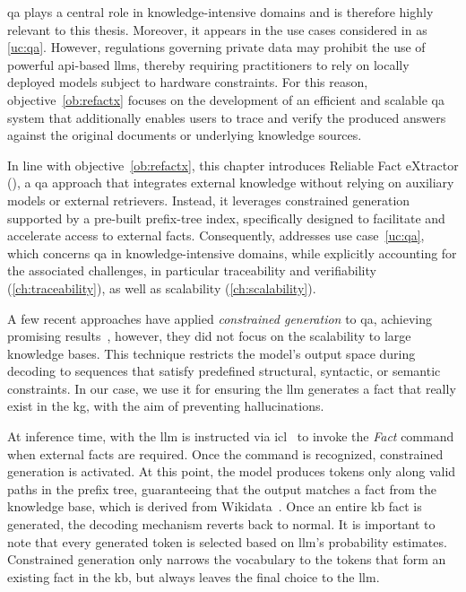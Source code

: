 \Acl{qa} plays a central role in knowledge-intensive domains and is therefore highly relevant to this thesis. Moreover, it appears in the use cases considered in  as \ref{uc:qa}. However, regulations governing private data may prohibit the use of powerful \ac{api}-based \acp{llm}, thereby requiring practitioners to rely on locally deployed models subject to hardware constraints. For this reason, objective~\ref{ob:refactx} focuses on the development of an efficient and scalable \ac{qa} system that additionally enables users to trace and verify the produced answers against the original documents or underlying knowledge sources.

In line with objective~\ref{ob:refactx}, this chapter introduces Reliable Fact eXtractor (), a \ac{qa} approach that integrates external knowledge without relying on auxiliary models or external retrievers. Instead, it leverages constrained generation supported by a pre-built prefix-tree index, specifically designed to facilitate and accelerate access to external facts. Consequently,  addresses use case~\ref{uc:qa}, which concerns \acl{qa} in knowledge-intensive domains, while explicitly accounting for the associated challenges, in particular traceability and verifiability (\ref{ch:traceability}), as well as scalability (\ref{ch:scalability}).


A few recent approaches have applied \emph{constrained generation} to \ac{qa}, achieving promising results~\cite{li-etal-2025-decoding-graphs,luo2024graphconstrainedreasoningfaithfulreasoning}, however, they did not focus on the scalability to large knowledge bases.
This technique restricts the model's output space during decoding to sequences that satisfy predefined structural, syntactic, or semantic constraints. In our case, we use it for ensuring the \ac{llm} generates a fact that really exist in the \ac{kg}, with the aim of preventing hallucinations.

At inference time, with  the \ac{llm} is instructed via \acf{icl}~\cite{dong2024survey} to invoke the \emph{Fact} command when external facts are required. Once the command is recognized, constrained generation is activated. At this point, the model produces tokens only along valid paths in the prefix tree, guaranteeing that the output matches a fact from the knowledge base, which is derived from Wikidata~\cite{wikidata}. Once an entire \ac{kb} fact is generated, the decoding mechanism reverts back to normal.
It is important to note that every generated token is selected based on \ac{llm}'s probability estimates. Constrained generation only narrows the vocabulary to the tokens that form an existing fact in the \ac{kb}, but always leaves the final choice to the \ac{llm}.


